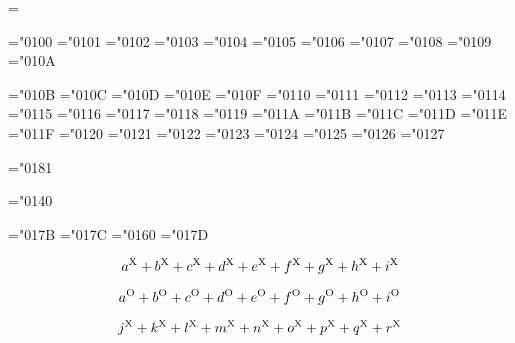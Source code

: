 
\mag=
\hoffset=-2in
\voffset=-0.3in


\nopagenumbers




\mathchardef\varGamma="0100
\mathchardef\varDelta="0101
\mathchardef\varTheta="0102
\mathchardef\varLambda="0103
\mathchardef\varXi="0104
\mathchardef\varPi="0105
\mathchardef\varSigma="0106
\mathchardef\varUpsilon="0107
\mathchardef\varPhi="0108
\mathchardef\varPsi="0109
\mathchardef\varOmega="010A

\mathchardef\alpha="010B
\mathchardef\beta="010C
\mathchardef\gamma="010D
\mathchardef\delta="010E
\mathchardef\epsilon="010F
\mathchardef\zeta="0110
\mathchardef\eta="0111
\mathchardef\theta="0112
\mathchardef\iota="0113
\mathchardef\kappa="0114
\mathchardef\lambda="0115
\mathchardef\mu="0116
\mathchardef\nu="0117
\mathchardef\xi="0118
\mathchardef\pi="0119
\mathchardef\rho="011A
\mathchardef\sigma="011B
\mathchardef\tau="011C
\mathchardef\upsilon="011D
\mathchardef\phi="011E
\mathchardef\chi="011F
\mathchardef\psi="0120
\mathchardef\omega="0121
\mathchardef\varepsilon="0122
\mathchardef\vartheta="0123
\mathchardef\varpi="0124
\mathchardef\varrho="0125
\mathchardef\varsigma="0126
\mathchardef\varphi="0127

\mathchardef\omicron="0181

\mathchardef\partial="0140

\mathchardef\imath="017B
\mathchardef\jmath="017C
\mathchardef\ell="0160
\mathchardef\wp="017D


$$
a^{\rm X}+
b^{\rm X}+
c^{\rm X}+
d^{\rm X}+
e^{\rm X}+
f^{\rm X}+
g^{\rm X}+
h^{\rm X}+
i^{\rm X}
$$

$$
a^{\rm O}+
b^{\rm O}+
c^{\rm O}+
d^{\rm O}+
e^{\rm O}+
f^{\rm O}+
g^{\rm O}+
h^{\rm O}+
i^{\rm O}
$$

$$
j^{\rm X}+
k^{\rm X}+
l^{\rm X}+
m^{\rm X}+
n^{\rm X}+
o^{\rm X}+
p^{\rm X}+
q^{\rm X}+
r^{\rm X}
$$

